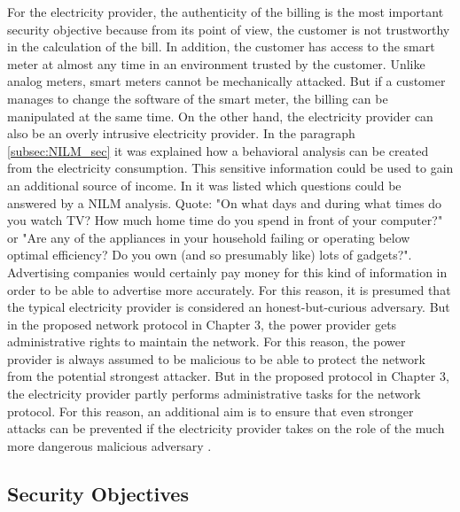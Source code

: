 For the electricity provider, the authenticity of the billing is the most important security objective because from its point of view, the customer is not trustworthy in the calculation of the bill. In addition, the customer has access to the smart meter at almost any time in an environment trusted by the customer. Unlike analog meters, smart meters cannot be mechanically attacked. But if a customer manages to change the software of the smart meter, the billing can be manipulated at the same time. On the other hand, the electricity provider can also be an overly intrusive electricity provider. In the paragraph \ref{subsec:NILM_sec} it was explained how a behavioral analysis can be created from the electricity consumption. This sensitive information could be used to gain an additional source of income. In \cite{quinn2009privacy} it was listed which questions could be answered by a \gls{NILM} analysis. Quote: "On what days and during what times do you watch TV? How much home time do you spend in front of your computer?" or "Are any of the appliances in your household failing or operating below optimal efficiency? Do you own (and so presumably like) lots of gadgets?". Advertising companies would certainly pay money for this kind of information in order to be able to advertise more accurately. For this reason, it is presumed that the typical electricity provider is considered an honest-but-curious adversary. But in the proposed network protocol in Chapter 3, the power provider gets administrative rights to maintain the network. For this reason, the power provider is always assumed to be malicious to be able to protect the network from the potential strongest attacker. But in the proposed protocol in Chapter 3, the electricity provider partly performs administrative tasks for the network protocol. For this reason, an additional aim is to ensure that even stronger attacks can be prevented if the electricity provider takes on the role of the much more dangerous malicious adversary \cite{lemay2007unified}.

\subsection{Security Objectives}

